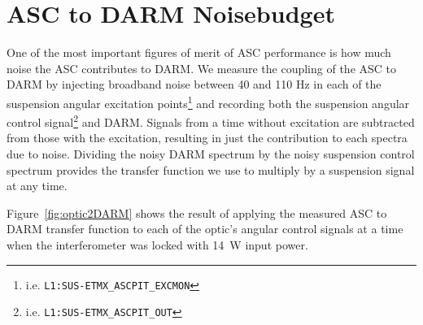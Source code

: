 



\section{ASC to DARM Noisebudget}
One of the most important figures of merit of ASC performance is how
much noise the ASC contributes to DARM. We measure the coupling of the
ASC to DARM by injecting broadband noise between 40 and 110 Hz in each
of the suspension angular excitation
points\footnote{i.e. \texttt{L1:SUS-ETMX\_ASCPIT\_EXCMON}} and
recording both the suspension angular control
signal\footnote{i.e. \texttt{L1:SUS-ETMX\_ASCPIT\_OUT}} and
DARM. Signals from a time without excitation are subtracted from those
with the excitation, resulting in just the contribution to each
spectra due to noise. Dividing the noisy DARM spectrum by the noisy
suspension control spectrum provides the transfer function we use to
multiply by a suspension signal at any time. 


Figure~\ref{fig:optic2DARM} shows the result of applying the measured
ASC to DARM transfer function to each of the optic's angular control signals at
a time when the interferometer was locked with 14~W input power.

